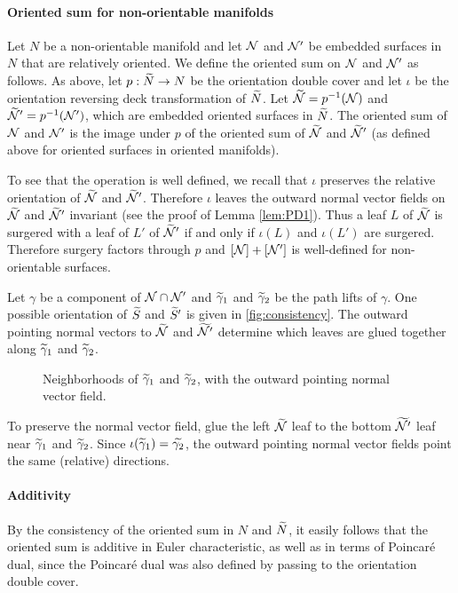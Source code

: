 \paragraph{Oriented sum for non-orientable manifolds}

Let $N$ be a non-orientable manifold and let $\mathcal{N}$ and $\mathcal{N}'$ be embedded surfaces in $N$ that are relatively oriented.
We define the oriented sum on $\mathcal{N}$ and $\mathcal{N}'$ as follows.
As above, let $p:\widetilde{N}\rightarrow N$ be the orientation double cover and let $\iota$ be the orientation reversing deck transformation of $\widetilde{N}$.
Let $\widetilde{\mathcal{N}}=p^{-1}(\mathcal{N})$ and $\widetilde{\mathcal{N}}'=p^{-1}(\mathcal{N}')$, which are embedded oriented surfaces in $\widetilde{N}$.
The oriented sum of $\mathcal{N}$ and $\mathcal{N}'$ is the image under $p$ of the oriented sum of $\widetilde{\mathcal{N}}$ and $\widetilde{\mathcal{N}}'$ (as defined above for oriented surfaces in oriented manifolds).

To see that the operation is well defined, we recall that $\iota$ preserves the relative orientation of $\widetilde{\mathcal{N}}$ and $\widetilde{\mathcal{N}}'$.  Therefore $\iota$ leaves the outward normal vector fields on $\widetilde{\mathcal{N}}$ and $\widetilde{\mathcal{N}}'$ invariant (see the proof of Lemma \ref{lem:PD1}).
Thus a leaf $L$ of $\widetilde{\mathcal{N}}$ is surgered with a leaf of $L'$ of $\widetilde{\mathcal{N}}'$ if and only if $\iota(L)$ and $\iota(L')$ are surgered.
Therefore surgery factors through $p$ and $[\mathcal{N}]+[\mathcal{N}']$ is well-defined for non-orientable surfaces.

\begin{example}
  Let $\gamma$ be a component of $\mathcal{N}\cap \mathcal{N}'$ and $\widetilde{\gamma}_1$ and $\widetilde{\gamma}_2$ be the path lifts of $\gamma$.
  One possible orientation of $\widetilde{S}$ and $\widetilde{S}'$ is given in  \autoref{fig:consistency}.  The outward pointing normal vectors to $\widetilde{\mathcal{N}}$ and $\widetilde{\mathcal{N}'}$ determine which leaves are glued together along $\widetilde{\gamma}_1$ and $\widetilde{\gamma}_2$.

\begin{figure}
  \centering
  \caption{Neighborhoods of $\widetilde{\gamma}_1$ and $\widetilde{\gamma}_2$, with the outward pointing normal vector field.}
  \label{fig:consistency}
\end{figure}

To preserve the normal vector field, glue the left $\widetilde{\mathcal{N}}$ leaf to the bottom $\widetilde{\mathcal{N}'}$ leaf near $\widetilde{\gamma}_1$ and $\widetilde{\gamma}_2$.
Since $\iota(\widetilde{\gamma}_1)=\widetilde{\gamma_2}$, the outward pointing normal vector fields point the same (relative) directions.
\end{example}

\paragraph{Additivity}

By the consistency of the oriented sum in $N$ and $\widetilde{N}$, it easily follows that the oriented sum is additive in Euler characteristic, as well as in terms of Poincar\'e dual, since the Poincar\'e dual was also defined by passing to the orientation double cover.
